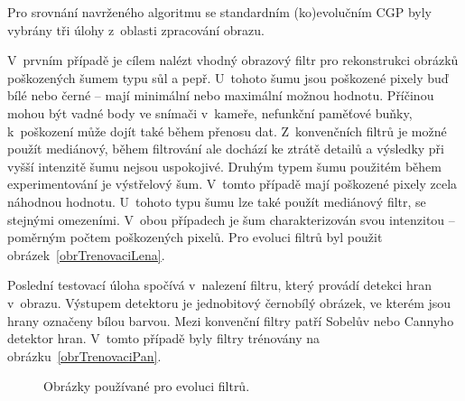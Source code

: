 Pro srovnání navrženého algoritmu se standardním (ko)evolučním CGP byly vybrány tři úlohy z~oblasti zpracování obrazu.

V~prvním případě je cílem nalézt vhodný obrazový filtr pro rekonstrukci obrázků poškozených šumem typu sůl a pepř. U~tohoto šumu jsou poškozené pixely buď bílé nebo černé -- mají minimální nebo maximální možnou hodnotu. Příčinou mohou být vadné body ve snímači v~kameře, nefunkční paměťové buňky, k~poškození může dojít také během přenosu dat. Z~konvenčních filtrů je možné použít mediánový, během filtrování ale dochází ke ztrátě detailů a výsledky při vyšší intenzitě šumu nejsou uspokojivé. Druhým typem šumu použitém během experimentování je výstřelový šum. V~tomto případě mají poškozené pixely zcela náhodnou hodnotu. U~tohoto typu šumu lze také použít mediánový filtr, se stejnými omezeními. V~obou případech je šum charakterizován svou intenzitou -- poměrným počtem poškozených pixelů. Pro evoluci filtrů byl použit obrázek~\ref{obrTrenovaciLena}.

Poslední testovací úloha spočívá v~nalezení filtru, který provádí detekci hran v~obrazu. Výstupem detektoru je jednobitový černobílý obrázek, ve kterém jsou hrany označeny bílou barvou. Mezi konvenční filtry patří Sobelův nebo Cannyho detektor hran. V~tomto případě byly filtry trénovány na obrázku~\ref{obrTrenovaciPan}.

\begin{figure}[htb]
    \centering
    \caption{Obrázky používané pro evoluci filtrů.}
    \label{obrTrenovaci}
\end{figure}

